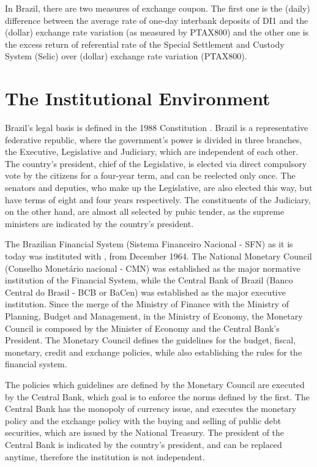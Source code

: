 \documentclass[a4paper]{article}
\begin{document}
In Brazil, there are two measures of exchange coupon. The first one is the (daily) difference between the average rate of one-day interbank deposits of DI1 and the (dollar) exchange rate variation (as measured by PTAX800) and the other one is the excess return of referential rate of the Special Settlement and Custody System (Selic) over (dollar) exchange rate variation (PTAX800).


\section{The Institutional Environment}


Brazil's legal basis is defined in the 1988 Constitution \citet{constituicao}. Brazil is a representative federative republic, where the government's power is divided in three branches, the Executive, Legislative and Judiciary, which are independent of each other. The country's president, chief of the Legislative, is elected via direct compulsory vote by the citizens for a four-year term, and can be reelected only once. The senators and deputies, who make up the Legislative, are also elected this way, but have terms of eight and four years respectively. The constituents of the Judiciary, on the other hand, are almost all selected by pubic tender, as the supreme ministers are indicated by the country's president.

The Brazilian Financial System (Sistema Financeiro Nacional - SFN) as it is today was instituted with \citet{lei4595}, from December 1964. The National Monetary Council (Conselho Monetário nacional - CMN) was established as the major normative institution of the Financial System, while the Central Bank of Brazil (Banco Central do Brasil - BCB or BaCen) was established as the major executive institution. Since the merge of the Ministry of Finance with the Ministry of Planning, Budget and Management, in the Ministry of Economy, the Monetary Council is composed by the Minister of Economy and the Central Bank's President. The Monetary Council defines the guidelines for the budget, fiscal, monetary, credit and exchange policies, while also establishing the rules for the financial system.

The policies which guidelines are defined by the Monetary Council are executed by the Central Bank, which goal is to enforce the norms defined by the first. The Central Bank has the monopoly of currency issue, and executes the monetary policy and the exchange policy with the buying and selling of public debt securities, which are issued by the National Treasury. The president of the Central Bank is indicated by the country's president, and can be replaced anytime, therefore the institution is not independent.
\end{document}
